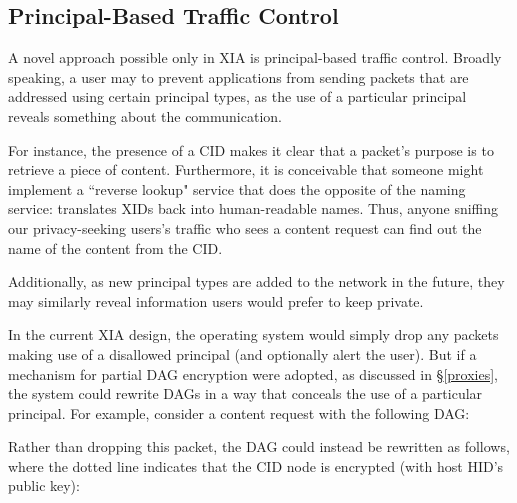 \documentclass{article}
\newcommand{\entrynode}[1]{
  \SetVertexNormal[Shape      = circle,
                   FillColor  = black,
                   LineWidth  = 0pt,
                   MinSize    = 0pt]
  \Vertex[L={\tiny\,}]{#1}
  \SetVertexNormal[Shape      = circle,
                   FillColor  = white,
                   LineWidth  = 2pt]
}
\newcommand{\encryptednode}[2]{
  \SetVertexNormal[Shape      = circle,
                   FillColor  = white,
                   LineWidth  = 2pt]
  \tikzstyle{VertexStyle}=[dotted, draw, circle]
  \Vertex[#1]{#2}
  \SetVertexNormal[Shape      = circle,
                   FillColor  = white,
                   LineWidth  = 2pt]
}
\begin{document}
\subsection{Principal-Based Traffic Control}
\label{principal-filtering}
A novel approach possible only in XIA is principal-based traffic control. Broadly speaking, a user may to prevent applications from sending packets that are addressed using certain principal types, as the use of a particular principal reveals something about the communication.

For instance, the presence of a CID makes it clear that a packet's purpose is to retrieve a piece of content. Furthermore, it is conceivable that someone might implement a ``reverse lookup" service that does the opposite of the naming service: translates XIDs back into human-readable names. Thus, anyone sniffing our privacy-seeking users's traffic who sees a content request can find out the name of the content from the CID.

Additionally, as new principal types are added to the network in the future, they may similarly reveal information users would prefer to keep private.

In the current XIA design, the operating system would simply drop any packets making use of a disallowed principal (and optionally alert the user). But if a mechanism for partial DAG encryption were adopted, as discussed in \S\ref{proxies}, the system could rewrite DAGs in a way that conceals the use of a particular principal. For example, consider a content request with the following DAG:
\begin{center}
\end{center}
Rather than dropping this packet, the DAG could instead be rewritten as follows, where the dotted line indicates that the CID node is encrypted (with host HID's public key):
\begin{center}
\end{center}
\end{document}
